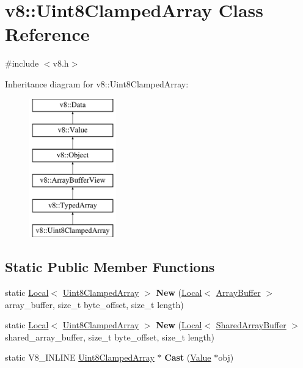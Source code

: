 \hypertarget{classv8_1_1Uint8ClampedArray}{}\section{v8\+:\+:Uint8\+Clamped\+Array Class Reference}
\label{classv8_1_1Uint8ClampedArray}


{\ttfamily \#include $<$v8.\+h$>$}

Inheritance diagram for v8\+:\+:Uint8\+Clamped\+Array\+:\begin{figure}[H]
\begin{center}
\leavevmode
\includegraphics[height=6.000000cm]{classv8_1_1Uint8ClampedArray}
\end{center}
\end{figure}
\subsection*{Static Public Member Functions}
\begin{DoxyCompactItemize}
\item 
\mbox{\label{classv8_1_1Uint8ClampedArray_abadcd9c3c77b071e21f3140e0ed4411f}} 
static \mbox{\hyperlink{classv8_1_1Local}{Local}}$<$ \mbox{\hyperlink{classv8_1_1Uint8ClampedArray}{Uint8\+Clamped\+Array}} $>$ {\bfseries New} (\mbox{\hyperlink{classv8_1_1Local}{Local}}$<$ \mbox{\hyperlink{classv8_1_1ArrayBuffer}{Array\+Buffer}} $>$ array\+\_\+buffer, size\+\_\+t byte\+\_\+offset, size\+\_\+t length)
\item 
\mbox{\label{classv8_1_1Uint8ClampedArray_a4f42e014ea0d35b33b6160bab223b4e3}} 
static \mbox{\hyperlink{classv8_1_1Local}{Local}}$<$ \mbox{\hyperlink{classv8_1_1Uint8ClampedArray}{Uint8\+Clamped\+Array}} $>$ {\bfseries New} (\mbox{\hyperlink{classv8_1_1Local}{Local}}$<$ \mbox{\hyperlink{classv8_1_1SharedArrayBuffer}{Shared\+Array\+Buffer}} $>$ shared\+\_\+array\+\_\+buffer, size\+\_\+t byte\+\_\+offset, size\+\_\+t length)
\item 
\mbox{\label{classv8_1_1Uint8ClampedArray_aa1358e0ac24e305af5c90ba71b73fa7c}} 
static V8\+\_\+\+I\+N\+L\+I\+NE \mbox{\hyperlink{classv8_1_1Uint8ClampedArray}{Uint8\+Clamped\+Array}} $\ast$ {\bfseries Cast} (\mbox{\hyperlink{classv8_1_1Value}{Value}} $\ast$obj)
\end{DoxyCompactItemize}
